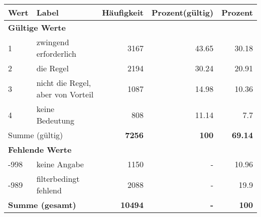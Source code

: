      \begin{longtable}{lXrrr}
     \toprule
     \textbf{Wert} & \textbf{Label} & \textbf{Häufigkeit} & \textbf{Prozent(gültig)} & \textbf{Prozent} \\
     \endhead
     \midrule
     \multicolumn{5}{l}{\textbf{Gültige Werte}}\\

     1 &
     \multicolumn{1}{X}{ zwingend erforderlich   } &


       \num{3167} &
       \num[round-mode=places,round-precision=2]{43.65} &
         \num[round-mode=places,round-precision=2]{30.18} \\

     2 &
     \multicolumn{1}{X}{ die Regel   } &


       \num{2194} &
       \num[round-mode=places,round-precision=2]{30.24} &
         \num[round-mode=places,round-precision=2]{20.91} \\

     3 &
     \multicolumn{1}{X}{ nicht die Regel, aber von Vorteil   } &


       \num{1087} &
       \num[round-mode=places,round-precision=2]{14.98} &
         \num[round-mode=places,round-precision=2]{10.36} \\

     4 &
     \multicolumn{1}{X}{ keine Bedeutung   } &


       \num{808} &
       \num[round-mode=places,round-precision=2]{11.14} &
         \num[round-mode=places,round-precision=2]{7.7} \\
     \midrule
     \multicolumn{2}{l}{Summe (gültig)} &
       \textbf{\num{7256}} &
     \textbf{\num{100}} &
       \textbf{\num[round-mode=places,round-precision=2]{69.14}} \\
     \multicolumn{5}{l}{\textbf{Fehlende Werte}}\\
       -998 &
       keine Angabe &
         \num{1150} &
        - &
         \num[round-mode=places,round-precision=2]{10.96} \\
       -989 &
       filterbedingt fehlend &
         \num{2088} &
        - &
         \num[round-mode=places,round-precision=2]{19.9} \\
     \midrule
     \multicolumn{2}{l}{\textbf{Summe (gesamt)}} &
          \textbf{\num{10494}} &
        \textbf{-} &
        \textbf{\num{100}} \\
     \bottomrule
     \end{longtable}
     

